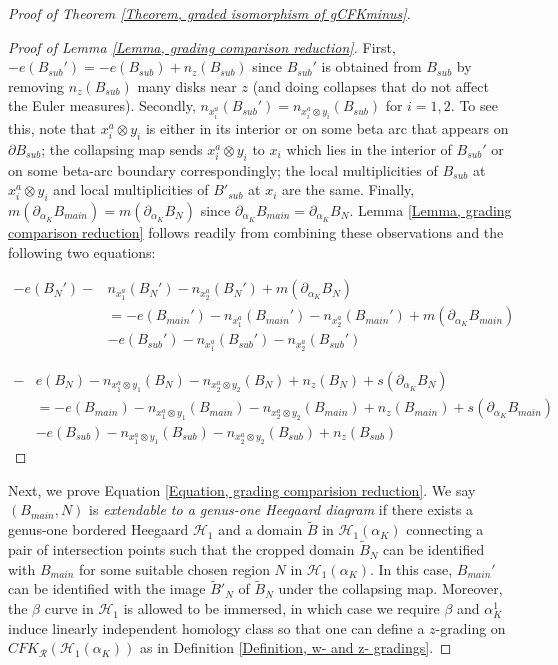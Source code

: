 \documentclass{amsart}
\theoremstyle{definition}
\theoremstyle{remark}
\numberwithin{equation}{section}
\numberwithin{equation}{section} \makeatletter
\begin{document}
\begin{proof}[Proof of Theorem \ref{Theorem, graded isomorphism of gCFKminus}]
\begin{proof}[Proof of Lemma \ref{Lemma, grading comparison reduction}]
First, $-e(B_{sub}')=-e(B_{sub})+n_z(B_{sub})$ since $B_{sub}'$ is obtained from $B_{sub}$ by removing $n_z(B_{sub})$ many disks near $z$ (and doing collapses that do not affect the Euler measures). Secondly, $n_{x_i^a}(B_{sub}')=n_{x_i^a\otimes y_i}(B_{sub})$ for $i=1,2$. To see this, note that $x_i^a\otimes y_i$ is either in its interior or on some beta arc that appears on $\partial B_{sub}$; the collapsing map sends $x_i^a\otimes y_i$ to $x_i$ which lies in the interior of $B_{sub}'$ or on some beta-arc boundary correspondingly; the local multiplicities of $B_{sub}$ at $x_i^a\otimes y_i$ and local multiplicities of $B'_{sub}$ at $x_i$ are the same. Finally, $m(\partial_{\alpha_K}B_{main})=m(\partial_{\alpha_K}B_{N})$ since $\partial_{\alpha_K}B_{main}=\partial_{\alpha_K}B_{N}$. Lemma \ref{Lemma, grading comparison reduction} follows readily from combining these observations and the following two equations:

\begin{equation}
\begin{aligned}
-e(B_N')-&n_{x_1^a}(B_N')-n_{x_2^a}(B_N')+m(\partial_{\alpha_K}B_N)\\&=-e(B_{main}')-n_{x_1^a}(B_{main}')-n_{x_2^a}(B_{main}')+m(\partial_{\alpha_K}B_{main})\\&-e(B_{sub}')-n_{x_1^a}(B_{sub}')-n_{x_2^a}(B_{sub}')
\end{aligned}
\end{equation}

\begin{equation}
\begin{aligned}
-&e(B_N)-n_{x_1^a \otimes y_1}(B_N)-n_{x_2^a \otimes y_2}(B_N)+n_z(B_N)+s(\partial_{\alpha_{K}}B_N)\\&=-e(B_{main})-n_{x_1^a \otimes y_1}(B_{main})-n_{x_2^a \otimes y_2}(B_{main})+n_z(B_{main})+ s(\partial_{\alpha_{K}}B_{main})\\&-e(B_{sub})-n_{x_1^a \otimes y_1}(B_{sub})-n_{x_2^a \otimes y_2}(B_{sub})+n_z(B_{sub})
\end{aligned}
\end{equation}
\end{proof}

Next, we prove Equation \ref{Equation, grading comparision reduction}. We say $(B_{main},N)$ is \textit{extendable to a genus-one Heegaard diagram} if there exists a genus-one bordered Heegaard $\mathcal{H}_1$ and a domain $\tilde{B}$ in $\mathcal{H}_1(\alpha_{K})$ connecting a pair of intersection points such that the cropped domain $\tilde{B}_N$ can be identified with $B_{main}$ for some suitable chosen region $N$ in $\mathcal{H}_1(\alpha_{K})$. In this case, $B_{main}'$ can be identified with the image $\tilde{B}'_N$ of $\tilde{B}_N$ under the collapsing map. Moreover, the $\beta$ curve in $\mathcal{H}_1$ is allowed to be immersed, in which case we require $\beta$ and $\alpha_K^1$ induce linearly independent homology class so that one can define a $z$-grading on $CFK_\mathcal{R}(\mathcal{H}_1(\alpha_{K}))$ as in Definition \ref{Definition, w- and z- gradings}.


\end{proof}
\end{document}

